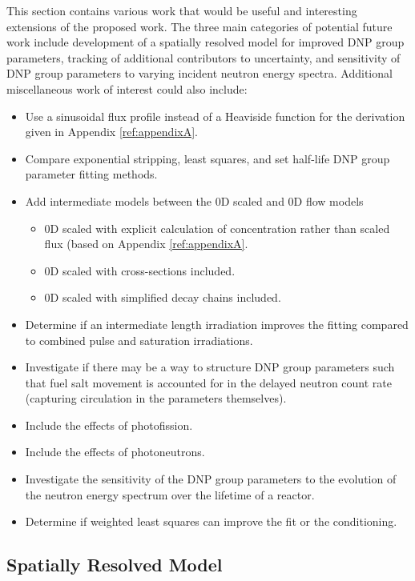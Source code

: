This section contains various work that would be useful and interesting extensions of the proposed work.
The three main categories of potential future work include development of a spatially resolved model for improved \gls{DNP} group parameters, tracking of additional contributors to uncertainty, and sensitivity of \gls{DNP} group parameters to varying incident neutron energy spectra.
Additional miscellaneous work of interest could also include:
\begin{itemize}
    \item Use a sinusoidal flux profile instead of a Heaviside function for the derivation given in Appendix \ref{ref:appendixA}.
    \item Compare exponential stripping, least squares, and set half-life \gls{DNP} group parameter fitting methods.
    \item Add intermediate models between the 0D scaled and 0D flow models
    \begin{itemize}
        \item 0D scaled with explicit calculation of concentration rather than scaled flux (based on Appendix \ref{ref:appendixA}.
        \item 0D scaled with cross-sections included.
        \item 0D scaled with simplified decay chains included.
    \end{itemize}
    \item Determine if an intermediate length irradiation improves the fitting compared to combined pulse and saturation irradiations.
    \item Investigate if there may be a way to structure \gls{DNP} group parameters such that fuel salt movement is accounted for in the delayed neutron count rate (capturing circulation in the parameters themselves).
    \item Include the effects of photofission.
    \item Include the effects of photoneutrons.
    \item Investigate the sensitivity of the \gls{DNP} group parameters to the evolution of the neutron energy spectrum over the lifetime of a reactor.
    \item Determine if weighted least squares can improve the fit or the conditioning.
\end{itemize}

\subsection{Spatially Resolved Model}

